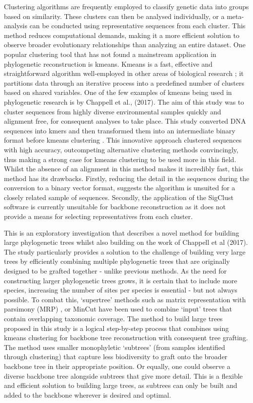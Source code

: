 \documentclass[12pt]{article}
\begin{document}
  Clustering algorithms are frequently employed to classify genetic data into groups based on similarity. These clusters can then be analysed individually, or a meta-analysis can be conducted using representative sequences from each cluster. This method reduces computational demands, making it a more efficient solution to observe broader evolutionary relationships than analyzing an entire dataset. One popular clustering tool that has not found a mainstream application in phylogenetic reconstruction is kmeans. Kmeans is a fast, effective and straightforward algorithm well-employed in other areas of biological research \cite{lu04}; it partitions data through an iterative process into a predefined number of clusters based on shared variables. One of the few examples of kmeans being used in phylogenetic research is by Chappell et al., (2017). The aim of this study was to cluster sequences from highly diverse environmental samples quickly and alignment free, for consequent analyses to take place. This study converted DNA sequences into kmers and then transformed them into an intermediate binary format before kmeans clustering \cite{Chappell2017}. This innovative approach clustered sequences with high accuracy, outcompeting alternative clustering methods convincingly, thus making a strong case for kmeans clustering to be used more in this field. Whilst the absence of an alignment in this method makes it incredibly fast, this method has its drawbacks. Firstly, reducing the detail in the sequences during the conversion to a binary vector format, suggests the algorithm is unsuited for a closely related sample of sequences. Secondly, the application of the SigClust software is currently unsuitable for backbone reconstruction as it does not provide a means for selecting representatives from each cluster.

  This is an exploratory investigation that describes a novel method for building large phylogenetic trees whilst also building on the work of Chappell et al (2017). The study particularly provides a solution to the challenge of building very large trees by efficiently combining multiple phylogenetic trees that are originally designed to be grafted together - unlike previous methods. As the need for constructing larger phylogenetic trees grows, it is certain that to include more species, increasing the number of sites per species is essential - but not always possible. To combat this,  `supertree' methods such as matrix representation with parsimony (MRP) \cite{MRP}, or MinCut \cite{MinCut} have been used to combine `input' trees that contain overlapping taxonomic coverage. The method to build large trees proposed in this study is a logical step-by-step process that combines using kmeans clustering for backbone tree reconstruction with consequent tree grafting. The method uses smaller monophyletic `subtrees' (from samples identified through clustering) that capture less biodiversity to graft onto the broader backbone tree in their appropriate position. Or equally, one could observe a diverse backbone tree alongside subtrees that give more detail. This is a flexible and efficient solution to building large trees, as subtrees can only be built and added to the backbone wherever is desired and optimal.
  
\end{document}

